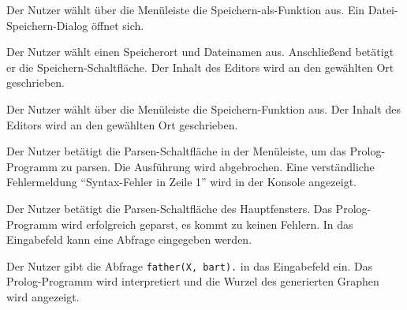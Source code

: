 \documentclass[parskip=full,11pt,twoside]{scrartcl}
\begin{document}
{Der Nutzer wählt über die Menüleiste die Speichern-als-Funktion aus.}
{Ein Datei-Speichern-Dialog öffnet sich.}

{Der Nutzer wählt einen Speicherort und Dateinamen aus. Anschließend betätigt er die Speichern-Schaltfläche.}
{Der Inhalt des Editors wird an den gewählten Ort geschrieben.}


{Der Nutzer wählt über die Menüleiste die Speichern-Funktion aus.}
{Der Inhalt des Editors wird an den gewählten Ort geschrieben.}


{Der Nutzer betätigt die Parsen-Schaltfläche in der Menüleiste, um das Prolog-Programm zu parsen.}
{Die Ausführung wird abgebrochen. Eine verständliche Fehlermeldung \enquote{Syntax-Fehler in Zeile 1} wird in der Konsole angezeigt.}


{Der Nutzer betätigt die Parsen-Schaltfläche des Hauptfensters.}
{Das Prolog-Programm wird erfolgreich geparst, es kommt zu keinen Fehlern. In das Eingabefeld kann eine Abfrage eingegeben werden.}

{Der Nutzer gibt die Abfrage \texttt{father(X, bart).} in das Eingabefeld ein.}
{Das Prolog-Programm wird interpretiert und die Wurzel des generierten Graphen wird angezeigt.}

\begin{minipage}{\linewidth}
\end{minipage}

\end{document}
